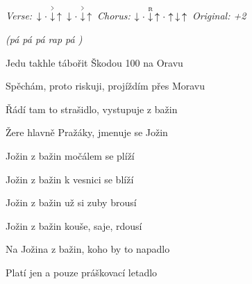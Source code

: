 \begin{song}


\begin{headerbox}
 \quad
\textit{Verse:} $\Down\Miss\AccentDown\Up\ \Down\Miss\AccentDown\Up$ \quad
\textit{Chorus:} $\Down\Miss\PluckDown{R}\Up\Miss\Up\Down\Up$ \quad
\textit{Original: +2}
\end{headerbox}

\begin{chordbox}
\par
{}\par
{}\par
{}\par
{}\par
{}\par
{}\par
{}\par
\end{chordbox}

\Large

\bigskip

 \textit{(pá pá pá rap pá )} \par
{}Jedu takhle tábořit Škodou 100 na Oravu \par
{}Spěchám, proto riskuji, projíždím přes Moravu \par
{}Řádí tam to strašidlo, vystupuje z bažin \par
{}Žere hlavně Pražáky, jmenuje se Jožin \par

\bigskip

\begin{chorusbox}{\Refren}
Jožin z bažin močálem se plíží \par
{}Jožin z bažin k vesnici se blíží \par
{}Jožin z bažin už si zuby brousí \par
{}Jožin z bažin kouše, saje, rdousí \par
{}Na Jožina z bažin, koho by to napadlo  \par
{}Platí jen a pouze práškovací letadlo  \par
\end{chorusbox}


\end{song}
